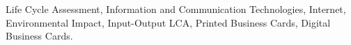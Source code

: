 \documentclass[conference]{IEEEtran}
\begin{document}
\begin{abstract}

\end{abstract}

\begin{IEEEkeywords}
Life Cycle Assessment, Information and Communication Technologies, Internet, Environmental Impact, Input-Output LCA, Printed Business Cards, Digital Business Cards. 
\end{IEEEkeywords}


%
\IEEEpeerreviewmaketitle
\end{document}
